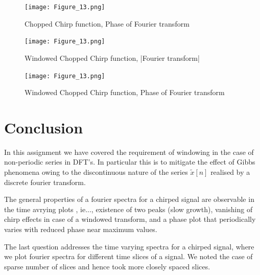 \documentclass{article}
\begin{document}
\begin{figure}[h!]
\centering
\texttt{[image: Figure\_13.png]}
\caption{Chopped Chirp function, Phase of Fourier transform}
\label{fig:universe}
\end{figure}

\begin{figure}[h!]
\centering
\texttt{[image: Figure\_13.png]}

\caption{Windowed Chopped Chirp function, |Fourier transform|}
\label{fig:universe}
\end{figure}

\begin{figure}[h!]
\centering
\texttt{[image: Figure\_13.png]}
\caption{Windowed Chopped Chirp function, Phase of Fourier transform}
\label{fig:universe}
\end{figure}


\section{Conclusion}
In this assignment we have covered the requirement of windowing in the case of non-periodic series in DFT's. In particular this is to mitigate the effect of Gibbs phenomena owing to the discontinuous nature of the series $\tilde{x}[n]$ realised by a discrete fourier transform.

The general properties of a fourier spectra for a chirped signal are observable in the time avrying plots , ie..., existence of two peaks (slow growth), vanishing of chirp effects in case of a windowed transform, and a phase plot that periodically varies with reduced phase near maximum values.

The last question addresses the time varying spectra for a chirped signal, where we plot fourier spectra for different time slices of a signal. We noted the case of sparse number of slices and hence took more closely spaced slices.
\end{document}
